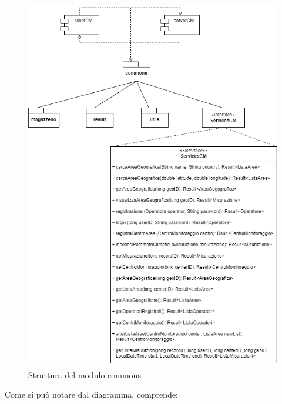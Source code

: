 \begin{figure}[h]
	\centering
	\caption{Struttura del modulo commons}
	\label{fig:commonscm}
	\includegraphics[width=0.75\linewidth]{../../fig/img/tecnico/CM.drawio}
\end{figure}
\pagebreak
Come si può notare dal diagramma, comprende:
